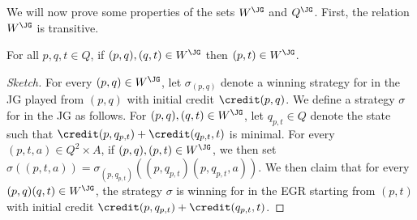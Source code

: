 \documentclass[a4paper]{article}
\begin{document}
We will now prove some properties of the sets $W^{\JG}$ and $Q^{\JG}$.
%
First, the relation $W^{\JG}$ is
transitive.
\begin{lemma}\label{lem:transitivity}
	For all
	$p,q,t \in Q$, if $(p,q),(q,t) \in W^{\JG}$ then $(p,t) \in W^{\JG}$.
\end{lemma}
\begin{proof}[Sketch]
	For every $(p,q) \in W^{\JG}$, let $\sigma_{(p,q)}$ denote a winning
	strategy for \eve in the JG played from $(p,q)$ with initial credit
	$\credit(p,q)$. We define a strategy $\sigma$ for \eve in the JG as
	follows. For $(p,q),(q,t) \in W^{\JG}$, let $q_{p,t} \in Q$ denote the
	state such that $\credit(p,q_{p,t}) + \credit(q_{p,t},t)$ is minimal.
	For every $(p,t,a) \in Q^2 \times A$, if $(p,q),(p,t) \in W^{\JG}$, we
	then set $\sigma\left((p,t,a)\right) =
	\sigma_{(p,q_{p,t})}((p,q_{p,t})(p,q_{p,t},a))$.  We then claim that for
	every $(p,q)(q,t) \in W^{\JG}$, the strategy $\sigma$ is winning for
	\eve in the EGR starting from $(p,t)$ with initial credit
	$\credit(p,q_{p,t}) + \credit(q_{p,t},t)$.
\end{proof}
\end{document}
